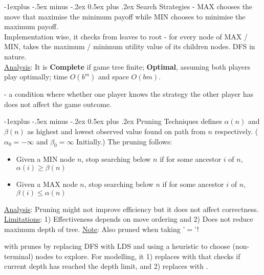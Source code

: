 \documentclass[10pt,landscape,letterpaper]{article}
\makeatletter
\renewcommand{\subsection}{\@startsection{subsection}{2}{0mm}%
                                {-1explus -.5ex minus -.2ex}%
                                {0.5ex plus .2ex}%
                                {\sffamily\normalsize\itshape}}
\makeatother
\begin{document}
\begin{multicols}{3}
\subsection{Search Strategies}
 - MAX chooses the move that maximise the minimum payoff while MIN chooses to minimise the maximum payoff.
\\
Implementation wise, it checks from leaves to root - for every node of MAX / MIN, takes the maximum / minimum utility value of its children nodes. DFS in nature.
\\
\underline{Analysis}: It is \textbf{Complete} if game tree finite; \textbf{Optimal}, assuming both players play optimally; time $O(b^m)$ and space $O(bm)$.

\smallskip

 - a condition where whether one player knows the strategy the other player has does not affect the game outcome.


\subsection{Pruning Techniques}
 defines $\alpha(n)$ and $\beta(n)$ as highest and lowest observed value found on path from $n$ respectively. ($\alpha_0 = -\infty$ and $\beta_0 = \infty$ Initially.) The pruning follows:
\begin{itemize}
    \item Given a MIN node $n$, stop searching below $n$ if for some ancestor $i$ of $n$, $\alpha(i) \ge \beta(n)$
    \item Given a MAX node $n$, stop searching below $n$ if for some ancestor $i$ of $n$, $\beta(i) \le \alpha(n)$
\end{itemize}
\underline{Analysis}: Pruning might not improve efficiency but it does not affect correctness. \underline{Limitations}: 1) Effectiveness depends on move ordering and 2) Does not reduce maximum depth of tree. \underline{Note}: Also pruned when taking '$=$'!

\smallskip

 with  prunes by replacing DFS with LDS and using a heuristic to choose (non-terminal) nodes to explore. For modelling, it 1) replaces  with  that checks if current depth has reached the depth limit, and 2) replaces  with .





\end{multicols}
\end{document}
